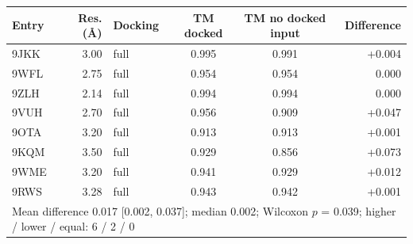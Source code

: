 \begin{tabular}{lrlccr}
\toprule
Entry & Res. (\AA) & Docking & TM docked & TM no docked input & Difference \\
\midrule
9JKK & 3.00 & full & 0.995 & 0.991 & +0.004 \\
9WFL & 2.75 & full & 0.954 & 0.954 & 0.000 \\
9ZLH & 2.14 & full & 0.994 & 0.994 & 0.000 \\
9VUH & 2.70 & full & 0.956 & 0.909 & +0.047 \\
9OTA & 3.20 & full & 0.913 & 0.913 & +0.001 \\
9KQM & 3.50 & full & 0.929 & 0.856 & +0.073 \\
9WME & 3.20 & full & 0.941 & 0.929 & +0.012 \\
9RWS & 3.28 & full & 0.943 & 0.942 & +0.001 \\
\midrule
\multicolumn{6}{l}{Mean difference 0.017 [0.002, 0.037]; median 0.002; Wilcoxon $p$ = 0.039; higher / lower / equal: 6 / 2 / 0} \\
\bottomrule
\end{tabular}
